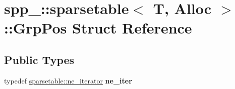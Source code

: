 \hypertarget{structspp___1_1sparsetable_1_1_grp_pos}{}\section{spp\+\_\+\+:\+:sparsetable$<$ T, Alloc $>$\+:\+:Grp\+Pos Struct Reference}
\label{structspp___1_1sparsetable_1_1_grp_pos}
\subsection*{Public Types}
\begin{DoxyCompactItemize}
\item 
typedef \hyperlink{classspp___1_1_two__d__iterator}{sparsetable\+::ne\+\_\+iterator} {\bfseries ne\+\_\+iter}\hypertarget{structspp___1_1sparsetable_1_1_grp_pos_a099478884f37fe76dca24ba2a4012370}{}\label{structspp___1_1sparsetable_1_1_grp_pos_a099478884f37fe76dca24ba2a4012370}

\end{DoxyCompactItemize}
